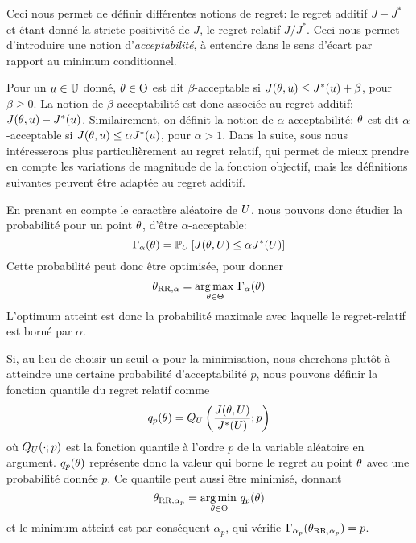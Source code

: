 \documentclass[../../Main_ManuscritThese.tex]{subfiles}
\begin{document}
Ceci nous permet de définir différentes notions de regret: le regret
additif $J - J^*$ et étant donné la stricte positivité de $J$, le
regret relatif $J/J^*$. Ceci nous permet d'introduire une notion
d'\emph{acceptabilité}, à entendre dans le sens d'écart par rapport au
minimum conditionnel.

Pour un $u\in\mathbb{U}$ donné, $\theta\in\Theta$ est dit
$\beta$-acceptable si $J(\theta, u) \leq J^*(u) + \beta$, pour
$\beta \geq 0$. La notion de $\beta$-acceptabilité est donc associée
au regret additif: $J(\theta, u) - J^*(u)$.  Similairement, on
définit la notion de $\alpha$-acceptabilité: $\theta$ est dit
$\alpha$-acceptable si $J(\theta, u) \leq \alpha J^*(u)$, pour
$\alpha > 1$. Dans la suite, sous nous intéresserons plus
particulièrement au regret relatif, qui permet de mieux prendre en
compte les variations de magnitude de la fonction objectif, mais les
définitions suivantes peuvent être adaptée au regret additif.


En prenant en compte le caractère aléatoire de $U$, nous pouvons
donc étudier la probabilité pour un point $\theta$, d'être $\alpha$-acceptable:
\begin{equation*}
\Gamma_{\alpha}(\theta) = \mathbb{P}_{U}\left[J(\theta,U) \leq \alpha J^*(U) \right]
\end{equation*}
Cette probabilité peut donc être optimisée, pour donner
\begin{equation*}
  \theta_{\mathrm{RR},\alpha} = \operatorname*{arg\,max \,}_{\theta \in\Theta} \Gamma_\alpha(\theta)
\end{equation*}
L'optimum atteint est donc la probabilité maximale avec laquelle le
regret-relatif est borné par $\alpha$.


Si, au lieu de choisir un seuil $\alpha$ pour la minimisation, nous
cherchons plutôt à atteindre une certaine probabilité d'acceptabilité
$p$, nous pouvons définir la fonction quantile du regret relatif comme
\begin{equation*}
  q_p(\theta) = Q_{U}\left(\frac{J(\theta,U)}{J^*(U)};p\right)
\end{equation*}
où $Q_{U}(\cdot;p)$ est la fonction quantile à l'ordre $p$ de la
variable aléatoire en argument. $q_p(\theta)$ représente donc la valeur qui
borne le regret au point $\theta$ avec une probabilité donnée $p$.
Ce quantile peut aussi être minimisé, donnant
\begin{equation*}
  \theta_{\mathrm{RR},\alpha_p} = \operatorname*{arg\,min \,}_{\theta \in \Theta} q_p(\theta)
\end{equation*}
et le minimum atteint est par conséquent $\alpha_p$, qui vérifie
$\Gamma_{\alpha_p}(\theta_{\mathrm{RR},\alpha_p}) = p$.
  
\end{document}
